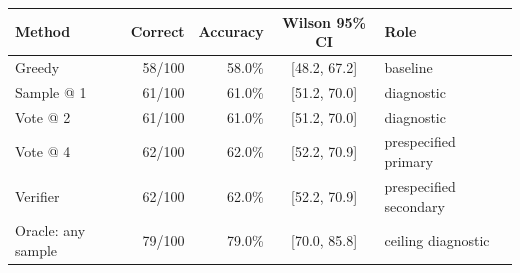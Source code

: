 \begin{tabular}{lrrcl}
\toprule
Method & Correct & Accuracy & Wilson 95\% CI & Role \\
\midrule
Greedy & 58/100 & 58.0\% & [48.2, 67.2] & baseline \\
Sample @ 1 & 61/100 & 61.0\% & [51.2, 70.0] & diagnostic \\
Vote @ 2 & 61/100 & 61.0\% & [51.2, 70.0] & diagnostic \\
Vote @ 4 & 62/100 & 62.0\% & [52.2, 70.9] & prespecified primary \\
Verifier & 62/100 & 62.0\% & [52.2, 70.9] & prespecified secondary \\
Oracle: any sample & 79/100 & 79.0\% & [70.0, 85.8] & ceiling diagnostic \\
\bottomrule
\end{tabular}
